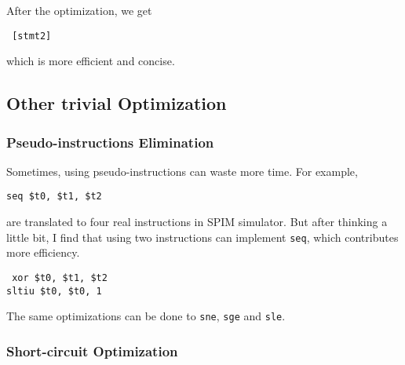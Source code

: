 \documentclass[journal]{IEEEtran}
\begin{document}
After the optimization, we get
\begin{center}
\texttt{
[stmt2]
}
\end{center}
which is more efficient and concise.

\subsection{Other trivial Optimization}

\subsubsection{Pseudo-instructions Elimination}

Sometimes, using pseudo-instructions can waste more time. For example, 
\begin{center}
\texttt{seq \$t0, \$t1, \$t2}
\end{center}
are translated to four real instructions in SPIM simulator. But after thinking a little bit, I find that using two instructions can implement \texttt{seq}, which contributes more efficiency.
\begin{center}
\texttt{
xor \$t0, \$t1, \$t2 \ \ \\
sltiu \$t0, \$t0, 1 \\
}
\end{center}

The same optimizations can be done to \texttt{sne}, \texttt{sge} and \texttt{sle}.

\subsubsection{Short-circuit Optimization}
\end{document}
